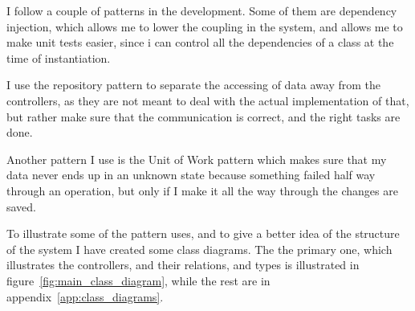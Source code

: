 I follow a couple of patterns in the development. Some of them are dependency
injection, which allows me to lower the coupling in the system, and allows me
to make unit tests easier, since i can control all the dependencies of a class
at the time of instantiation.

I use the repository pattern to separate the accessing of data away from the
controllers, as they are not meant to deal with the actual implementation of
that, but rather make sure that the communication is correct, and the right
tasks are done.

Another pattern I use is the Unit of Work pattern which makes sure that my data
never ends up in an unknown state because something failed half way through an
operation, but only if I make it all the way through the changes are saved.

To illustrate some of the pattern uses, and to give a better idea of the
structure of the system I have created some class diagrams. The the primary one,
which illustrates the controllers, and their relations, and types is illustrated
in figure~\ref{fig:main_class_diagram}, while the rest are in
appendix~\ref{app:class_diagrams}.